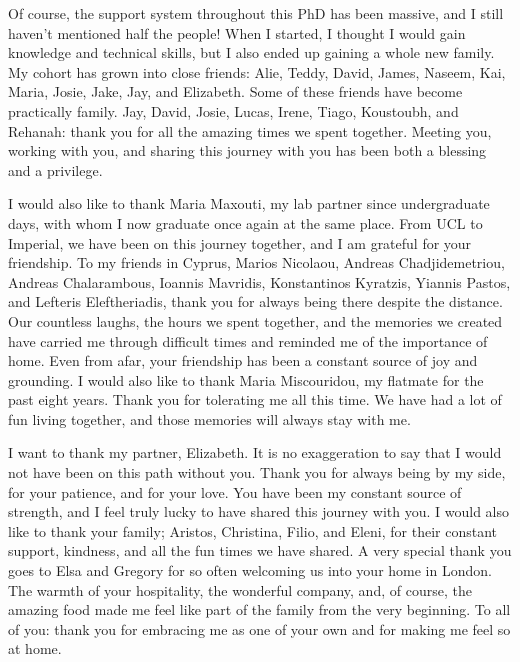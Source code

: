 \documentclass[12pt, a4paper, twoside]{report}
\begin{document}
Of course, the support system throughout this PhD has been massive, and I still haven’t mentioned half the people! When I started, I thought I would gain knowledge and technical skills, but I also ended up gaining a whole new family. My cohort has grown into close friends: Alie, Teddy, David, James, Naseem, Kai, Maria, Josie, Jake, Jay, and Elizabeth.  Some of these friends have become practically family. Jay, David, Josie, Lucas, Irene, Tiago, Koustoubh, and Rehanah: thank you for all the amazing times we spent together. Meeting you, working with you, and sharing this journey with you has been both a blessing and a privilege.  

I would also like to thank Maria Maxouti, my lab partner since undergraduate days, with whom I now graduate once again at the same place. From UCL to Imperial, we have been on this journey together, and I am grateful for your friendship. To my friends in Cyprus, Marios Nicolaou, Andreas Chadjidemetriou, Andreas Chalarambous, Ioannis Mavridis, Konstantinos Kyratzis, Yiannis Pastos, and Lefteris Eleftheriadis, thank you for always being there despite the distance. Our countless laughs, the hours we spent together, and the memories we created have carried me through difficult times and reminded me of the importance of home. Even from afar, your friendship has been a constant source of joy and grounding.  I would also like to thank Maria Miscouridou, my flatmate for the past eight years. Thank you for tolerating me all this time. We have had a lot of fun living together, and those memories will always stay with me.  

I want to thank my partner, Elizabeth. It is no exaggeration to say that I would not have been on this path without you. Thank you for always being by my side, for your patience, and for your love. You have been my constant source of strength, and I feel truly lucky to have shared this journey with you.  I would also like to thank your family; Aristos, Christina, Filio, and Eleni, for their constant support, kindness, and all the fun times we have shared. A very special thank you goes to Elsa and Gregory for so often welcoming us into your home in London. The warmth of your hospitality, the wonderful company, and, of course, the amazing food made me feel like part of the family from the very beginning. To all of you: thank you for embracing me as one of your own and for making me feel so at home.  
\end{document}

